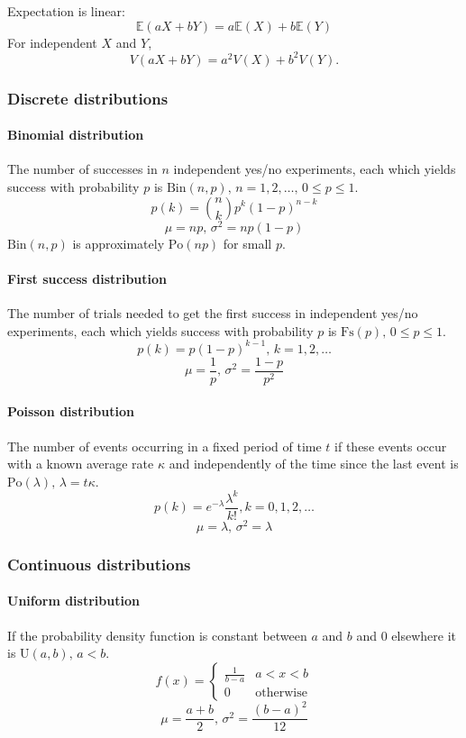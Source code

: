 \begin{multicols}{\Columns}
Expectation is linear:
\[\mathbb{E}(aX+bY) = a\mathbb{E}(X)+b\mathbb{E}(Y)\]
For independent $X$ and $Y$, \[V(aX+bY) = a^2V(X)+b^2V(Y).\]

\subsubsection{Discrete distributions}

\paragraph{Binomial distribution}
The number of successes in $n$ independent yes/no experiments, each which yields success with probability $p$ is $\textrm{Bin}(n,p),\,n=1,2,\dots,\, 0\leq p\leq1$.
\[p(k)=\binom{n}{k}p^k(1-p)^{n-k}\]
\[\mu = np,\,\sigma^2=np(1-p)\]
$\textrm{Bin}(n,p)$ is approximately $\textrm{Po}(np)$ for small $p$.

\paragraph{First success distribution}
The number of trials needed to get the first success in independent yes/no experiments, each which yields success with probability $p$ is $\textrm{Fs}(p),\,0\leq p\leq1$.
\[p(k)=p(1-p)^{k-1},\,k=1,2,\dots\]
\[\mu = \frac1p,\,\sigma^2=\frac{1-p}{p^2}\]

\paragraph{Poisson distribution}
The number of events occurring in a fixed period of time $t$ if these events occur with a known average rate $\kappa$ and independently of the time since the last event is $\textrm{Po}(\lambda),\,\lambda=t\kappa$.
\[p(k)=e^{-\lambda}\frac{\lambda^k}{k!}, k=0,1,2,\dots\]
\[\mu=\lambda,\,\sigma^2=\lambda\]

\subsubsection{Continuous distributions}

\paragraph{Uniform distribution}
If the probability density function is constant between $a$ and $b$ and 0 elsewhere it is $\textrm{U}(a,b),\,a<b$.
\[f(x) = \left\{
\begin{array}{cl}
\frac{1}{b-a} & a<x<b\\
0 & \textrm{otherwise}
\end{array}\right.\]
\[\mu=\frac{a+b}{2},\,\sigma^2=\frac{(b-a)^2}{12}\]


\end{multicols}
